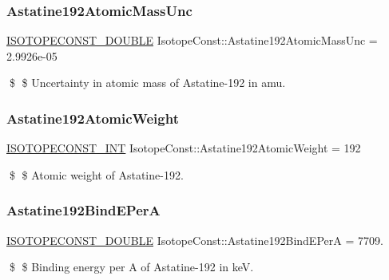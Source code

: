 \subsubsection{\texorpdfstring{Astatine192\+Atomic\+Mass\+Unc}{Astatine192AtomicMassUnc}}
{\footnotesize\ttfamily \mbox{\hyperlink{group___isotope_const-_macros_ga8f45a7272ce02c0b4c65c44636ed719a}{I\+S\+O\+T\+O\+P\+E\+C\+O\+N\+S\+T\+\_\+\+D\+O\+U\+B\+LE}} Isotope\+Const\+::\+Astatine192\+Atomic\+Mass\+Unc = 2.\+9926e-\/05}

\$ \$ Uncertainty in atomic mass of Astatine-\/192 in amu. \mbox{\label{group___isotope_const-_astatine-_at192_ga3ff79bf14a3b88201faba84a4178dc95}} 
\subsubsection{\texorpdfstring{Astatine192\+Atomic\+Weight}{Astatine192AtomicWeight}}
{\footnotesize\ttfamily \mbox{\hyperlink{group___isotope_const-_macros_ga5f18360b3e99483a35c32d789e62621c}{I\+S\+O\+T\+O\+P\+E\+C\+O\+N\+S\+T\+\_\+\+I\+NT}} Isotope\+Const\+::\+Astatine192\+Atomic\+Weight = 192}

\$ \$ Atomic weight of Astatine-\/192. \mbox{\label{group___isotope_const-_astatine-_at192_ga198c5175dd4b0a5f46bcbb9a67f9a495}} 
\subsubsection{\texorpdfstring{Astatine192\+Bind\+E\+PerA}{Astatine192BindEPerA}}
{\footnotesize\ttfamily \mbox{\hyperlink{group___isotope_const-_macros_ga8f45a7272ce02c0b4c65c44636ed719a}{I\+S\+O\+T\+O\+P\+E\+C\+O\+N\+S\+T\+\_\+\+D\+O\+U\+B\+LE}} Isotope\+Const\+::\+Astatine192\+Bind\+E\+PerA = 7709.}

\$ \$ Binding energy per A of Astatine-\/192 in keV. \mbox{\label{group___isotope_const-_astatine-_at192_ga513b8ae8189089b1bfeedfa0e0b7de56}} 
